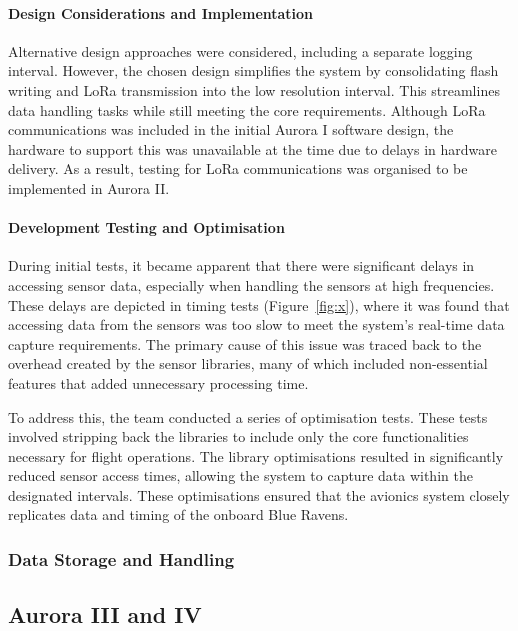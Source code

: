 \paragraph{Design Considerations and Implementation}

Alternative design approaches were considered, including a separate logging interval. However, the chosen design simplifies the system by consolidating flash writing and LoRa transmission into the low resolution interval. This streamlines data handling tasks while still meeting the core requirements. Although LoRa communications was included in the initial Aurora I software design, the hardware to support this was unavailable at the time due to delays in hardware delivery. As a result, testing for LoRa communications was organised to be implemented in Aurora II. 

\paragraph{Development Testing and Optimisation}

During initial tests, it became apparent that there were significant delays in accessing sensor data, especially when handling the sensors at high frequencies. These delays are depicted in timing tests (Figure~\ref{fig:x}), where it was found that accessing data from the sensors was too slow to meet the system’s real-time data capture requirements. The primary cause of this issue was traced back to the overhead created by the sensor libraries, many of which included non-essential features that added unnecessary processing time. 

To address this, the team conducted a series of optimisation tests. These tests involved stripping back the libraries to include only the core functionalities necessary for flight operations. The library optimisations resulted in significantly reduced sensor access times, allowing the system to capture data within the designated intervals. These optimisations ensured that the avionics system closely replicates data and timing of the onboard Blue Ravens.

\subsubsection{Data Storage and Handling}

\subsection{Aurora III and IV}
